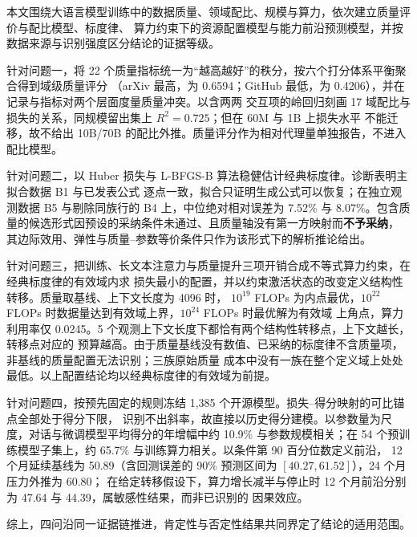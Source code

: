 
本文围绕大语言模型训练中的数据质量、领域配比、规模与算力，依次建立质量评价与配比模型、标度律、
算力约束下的资源配置模型与能力前沿预测模型，并按数据来源与识别强度区分结论的证据等级。

针对问题一，将 22 个质量指标统一为“越高越好”的秩分，按六个打分体系平衡聚合得到域级质量评分
（arXiv 最高，为 0.6594；GitHub 最低，为 0.4206），并在记录与指标对两个层面度量质量冲突。以含两两
交互项的岭回归刻画 17 域配比与损失的关系，同规模留出集上 $R^2=0.725$；但在 60M 与 1B 上损失水平
不能迁移，故不给出 10B/70B 的配比外推。质量评分作为相对代理量单独报告，不进入配比模型。

针对问题二，以 Huber 损失与 L-BFGS-B 算法稳健估计经典标度律。诊断表明主拟合数据 B1 与已发表公式
逐点一致，拟合只证明生成公式可以恢复；在独立观测数据 B5 与剔除同族行的 B4 上，中位绝对相对误差为
7.52\% 与 8.07\%。包含质量的候选形式因预设的采纳条件未通过、且质量轴没有第一方映射而\textbf{不予采纳}，
其边际效用、弹性与质量–参数等价条件只作为该形式下的解析推论给出。

针对问题三，把训练、长文本注意力与质量提升三项开销合成不等式算力约束，在经典标度律的有效域内求
损失最小的配置，并以约束激活状态的改变定义结构性转移。质量取基线、上下文长度为 4096 时，
$10^{19}$ FLOPs 为内点最优，$10^{22}$ FLOPs 时数据量达到有效域上界，$10^{24}$ FLOPs 时最优解为有效域
上角点，算力利用率仅 0.0245。5 个观测上下文长度下都恰有两个结构性转移点，上下文越长，转移点对应的
预算越高。由于质量基线没有数值、已采纳的标度律不含质量项，非基线的质量配置无法识别；三族原始质量
成本中没有一族在整个定义域上处处最低。以上配置结论均以经典标度律的有效域为前提。

针对问题四，按预先固定的规则冻结 1,385 个开源模型。损失–得分映射的可比锚点全部处于得分下限，
识别不出斜率，故直接以历史得分建模。以参数量为尺度，对话与微调模型平均得分的年增幅中约 10.9\%
与参数规模相关；在 54 个预训练模型子集上，约 65.7\% 与训练算力相关。以条件第 90 百分位数定义前沿，
12 个月延续基线为 50.89（含回测误差的 90\% 预测区间为 $[40.27, 61.52]$），24 个月压力外推为 60.80；
在给定转移假设下，算力增长减半与停止时 12 个月前沿分别为 47.64 与 44.39，属敏感性结果，而非已识别的
因果效应。

综上，四问沿同一证据链推进，肯定性与否定性结果共同界定了结论的适用范围。

